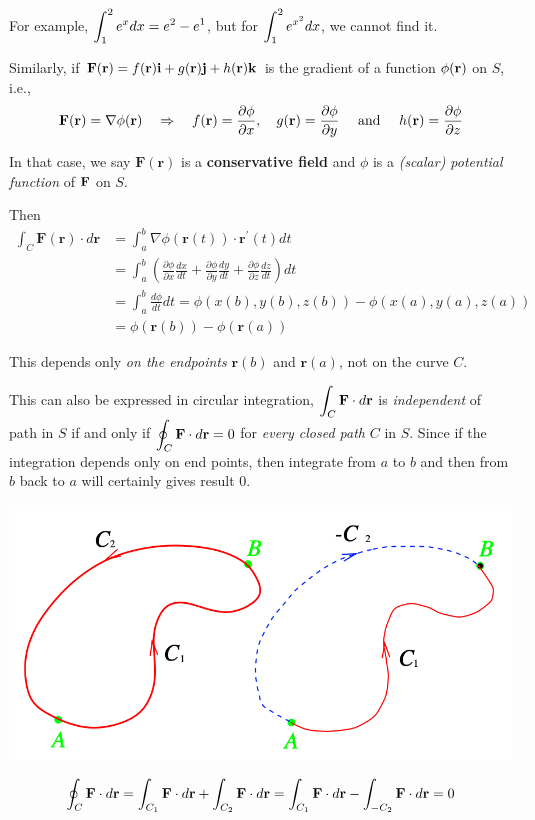 \documentclass[11pt, a4paper]{MATH2023}
\newcommand{\ii}{{\bf i}}
\newcommand{\jj}{{\bf j}}
\newcommand{\kk}{{\bf k}}
\newcommand{\rr}{{\bf r}}
\newcommand{\FF}{{\bf F}}
\begin{document}
\begin{spacing}{1.3}
    For example, $\displaystyle \int_1^2 e^x dx = e^2-e^1$, but for $\displaystyle \int_1^2 e^{x^2} dx$,
    we cannot find it.

    \vspace{0.3in}
    Similarly, if $\FF(\rr)=f(\rr)\ii +g(\rr)\jj +h(\rr)\kk$ is the gradient of a function 
    $\phi(\rr)$ on $S$, i.e.,
    $$\FF(\rr)=\nabla \phi(\mathbf{r}) \quad \Rightarrow \quad 
    f(\mathbf{r})=\frac{\partial \phi}{\partial x}, \quad g(\mathbf{r})=\frac{\partial \phi}{\partial y} \quad 
    \text { and } \quad h(\mathbf{r})=\frac{\partial \phi}{\partial z}$$

    In that case, we say $\mathbf{F}(\mathbf{r})$ is a {\bf conservative field} and $\phi$ is a 
    {\it (scalar) potential function} of $\FF$ on $S$.
    
    Then
    $$\begin{aligned}
    \int_{C} \mathbf{F}(\mathbf{r}) \cdot d \mathbf{r} &=\int_{a}^{b} \nabla \phi(\mathbf{r}(t)) \cdot \mathbf{r}^{\prime}(t) d t \\
    &=\int_{a}^{b}\left(\frac{\partial \phi}{\partial x} \frac{d x}{d t}+\frac{\partial \phi}{\partial y} \frac{d y}{d t}+\frac{\partial \phi}{\partial z} \frac{d z}{d t}\right) d t \\
    &=\int_{a}^{b} \frac{d \phi}{d t} d t=\phi(x(b), y(b), z(b))-\phi(x(a), y(a), z(a)) \\
    &=\phi(\mathbf{r}(b))-\phi(\mathbf{r}(a))
    \end{aligned}$$

    This depends only {\it on the endpoints} $\mathbf{r}(b)$ and $\mathbf{r}(a)$, not on the curve $C.$

    \vspace{0.5in}
    This can also be expressed in circular integration, $\disp \int_C \FF\cdot d\rr$ is {\it independent} of 
    path in $S$ if and only if $\disp \oint_C \FF\cdot d\rr =0$ for {\it every closed path} $C$ in $S$.
    Since if the integration depends only on end points, then integrate from $a$ to $b$ and then from $b$
    back to $a$ will certainly gives result 0.
    \begin{center}
        \includegraphics[scale=0.4]{images/Ch15-circular-integ.png}
    \end{center}
    $$\oint_{C} \FF \cdot d \rr =\int_{C_{1}} \FF \cdot d \rr+\int_{C_{2}} \mathbf{F} \cdot d \mathbf{r} 
    =\int_{C_{1}} \mathbf{F} \cdot d \mathbf{r}-\int_{-C_{2}} \mathbf{F} \cdot d \mathbf{r}=0 $$


\end{spacing}
\end{document}
